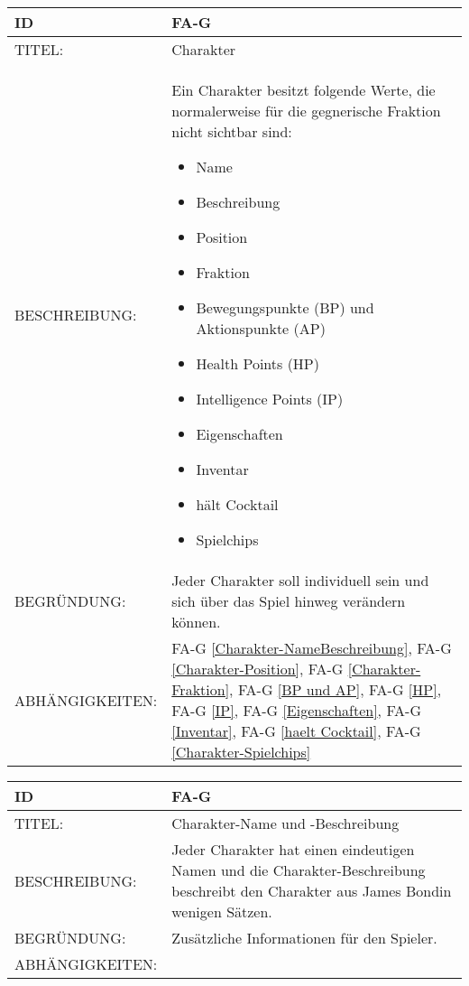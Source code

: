 \begin{tabularx}{16cm}{l|X}
	{table}\label{Charakter}
	\textbf{ID} & \textbf{FA-G \arabic{table}} \\
	\hline
	TITEL: & Charakter \\
	\hline
	BESCHREIBUNG: & Ein Charakter besitzt folgende Werte, die normalerweise für die gegnerische Fraktion nicht sichtbar sind: 
	\begin{itemize}
		\item Name
		\item Beschreibung
		\item Position
		\item Fraktion
		\item Bewegungspunkte (BP) und Aktionspunkte (AP)
		\item Health Points (HP)
		\item Intelligence Points (IP)
		\item Eigenschaften
		\item Inventar
		\item hält Cocktail
		\item Spielchips
	\end{itemize}
	\\
	\hline
	BEGRÜNDUNG: & Jeder Charakter soll individuell sein und sich über das Spiel hinweg verändern können.\\
	\hline
	ABHÄNGIGKEITEN: & FA-G \ref{Charakter-NameBeschreibung}, FA-G \ref{Charakter-Position}, FA-G \ref{Charakter-Fraktion},  FA-G \ref{BP und AP}, FA-G \ref{HP}, FA-G \ref{IP}, FA-G \ref{Eigenschaften}, FA-G \ref{Inventar}, FA-G \ref{haelt Cocktail}, FA-G \ref{Charakter-Spielchips} \\
\end{tabularx}

\begin{tabularx}{16cm}{l|X}
	{table}\label{Charakter-NameBeschreibung}
	\textbf{ID} & \textbf{FA-G \arabic{table}} \\
	\hline
	TITEL: & Charakter-Name und -Beschreibung \\
	\hline
	BESCHREIBUNG: & Jeder Charakter hat einen eindeutigen Namen und die Charakter-Beschreibung beschreibt den Charakter aus \glqq James Bond\grqq in wenigen Sätzen.\\
	\hline
	BEGRÜNDUNG: & Zusätzliche Informationen für den Spieler. \\
	\hline
	ABHÄNGIGKEITEN: & \\
\end{tabularx}

